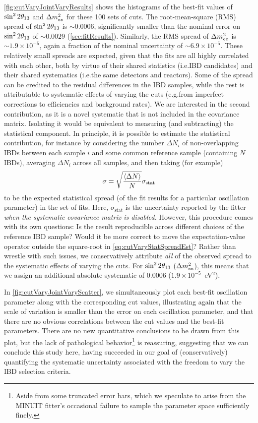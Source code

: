\documentclass[../thesis.tex]{subfiles}
\begin{document}
\autoref{fig:cutVaryJointVaryResults} shows the histograms of the best-fit values of $\sin^2 2\theta_{13}$ and $\Delta m^2_{ee}$ for these 100 sets of cuts. The root-mean-square (RMS) spread of $\sin^2 2\theta_{13}$ is $\sim0.0006$, significantly smaller than the nominal error on $\sin^2 2\theta_{13}$ of $\sim0.0029$ (\autoref{sec:fitResults}). Similarly, the RMS spread of $\Delta m^2_{ee}$ is $\sim1.9\times10^{-5}$, again a fraction of the nominal uncertainty of $\sim6.9\times10^{-5}$. These relatively small spreads are expected, given that the fits are all highly correlated with each other, both by virtue of their shared statistics (i.e.\@ IBD candidates) and their shared systematics (i.e.\@ the same detectors and reactors). Some of the spread can be credited to the residual differences in the IBD samples, while the rest is attributable to systematic effects of varying the cuts (e.g.\@ from imperfect corrections to efficiencies and background rates). We are interested in the second contribution, as it is a novel systematic that is not included in the covariance matrix. Isolating it would be equivalent to measuring (and subtracting) the statistical component. In principle, it is possible to estimate the statistical contribution, for instance by considering the number $\Delta N_i$ of non-overlapping IBDs between each sample $i$ and some common reference sample (containing $N$ IBDs), averaging $\Delta N_i$ across all samples, and then taking (for example)
\begin{equation}
  \label{eq:cutVaryStatSpreadEst}
  \sigma = \sqrt{\frac{\langle \Delta N \rangle}{N}} \sigma_{\mathrm{stat}}
\end{equation}
to be the expected statistical spread (of the fit results for a particular oscillation parameter) in the set of fits. Here, $\sigma_{\mathrm{stat}}$ is the uncertainty reported by the fitter \emph{when the systematic covariance matrix is disabled.} However, this procedure comes with its own questions: Is the result reproducible across different choices of the reference IBD sample? Would it be more correct to move the expectation-value operator outside the square-root in \autoref{eq:cutVaryStatSpreadEst}? Rather than wrestle with such issues, we conservatively attribute \emph{all} of the observed spread to the systematic effects of varying the cuts. For $\sin^2 2\theta_{13}$ ($\Delta m^2_{ee}$), this means that we assign an additional absolute systematic of 0.0006 ($1.9\times10^{-5}$~eV$^2$).

In \autoref{fig:cutVaryJointVaryScatter}, we simultaneously plot each best-fit oscillation parameter along with the corresponding cut values, illustrating again that the scale of variation is smaller than the error on each oscillation parameter, and that there are no obvious correlations between the cut values and the best-fit parameters. There are no new quantitative conclusions to be drawn from this plot, but the lack of pathological behavior\footnote{Aside from some truncated error bars, which we speculate to arise from the MINUIT fitter's occasional failure to sample the parameter space sufficiently finely.} is reassuring, suggesting that we can conclude this study here, having succeeded in our goal of (conservatively) quantifying the systematic uncertainty associated with the freedom to vary the IBD selection criteria.
\end{document}
